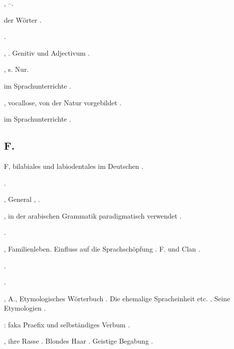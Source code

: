\begin{register}
,  \pageref{sp.196}–\pageref{sp.205}.

 der Wörter \pageref{sp.157}.

 \pageref{sp.216}.

 \pageref{sp.150}, \pageref{sp.282}. Genitiv und Adjectivum \pageref{sp.455}.

, s. Nur.

 im Sprachunterrichte \pageref{sp.72}.

, vocallose, von der Natur vorgebildet \pageref{sp.314}.

 im Sprachunterrichte \pageref{sp.72}.


\subsection*{F.}\label{reg.F}

F, bilabiales und labiodentales im Deutschen \pageref{sp.188}.


 \pageref{sp.102}.


, General \pageref{sp.32}, \pageref{sp.69}.

, in der arabischen Grammatik paradigmatisch verwendet \pageref{sp.117}.

 \pageref{sp.282}.

, Familienleben. Einfluss auf die Sprachschöpfung \pageref{sp.306}. F. und Clan \pageref{sp.307}.


 \pageref{sp.315}.

 \pageref{sp.187}.

, A., Etymologisches Wörterbuch \pageref{sp.293}. Die ehemalige Spracheinheit etc. \pageref{sp.294}. Seine Etymologien \pageref{sp.295}.

: \sed{\pageref{sp.280}} faka Praefix und selbständiges Verbum \pageref{sp.350}.

, ihre Rasse \pageref{sp.147}. Blondes Haar \pageref{sp.293}. Geistige Begabung \pageref{sp.389}.


\end{register}

